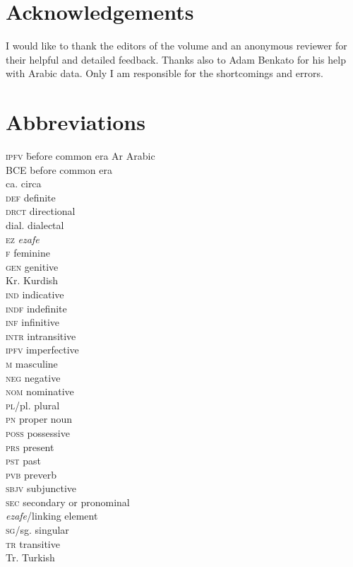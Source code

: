 \documentclass[output=paper]{langsci/langscibook}
\begin{document}
\section*{Acknowledgements}
I would like to thank the editors of the volume and an anonymous reviewer for their helpful and detailed feedback. Thanks also to Adam Benkato for his help with Arabic data. Only I am responsible for the shortcomings and errors. 

\section*{Abbreviations}
\begin{multicols}{2}
\begin{tabbing}
\textsc{ipfv} \hspace{1em} \= before common era\kill
Ar              \> Arabic\\
BCE             \> before common era\\
ca.             \> circa\\
\textsc{def}    \> definite \\
\textsc{drct}   \> directional\\
dial.           \> dialectal \\
\textsc{ez}     \> \textit{ezafe} \\
\textsc{f}      \> feminine \\
\textsc{gen}    \> genitive\\
Kr.             \> Kurdish\\
\textsc{ind}    \> indicative \\
\textsc{indf}   \> indefinite \\
\textsc{inf}    \> infinitive\\
\textsc{intr}   \> intransitive\\
\textsc{ipfv}   \> imperfective \\
\textsc{m}      \> masculine \\
\textsc{neg}    \> negative\\
\textsc{nom}    \> nominative\\
\textsc{pl/}pl. \> plural \\
\textsc{pn}     \> proper noun\\
\textsc{poss}   \> possessive \\
\textsc{prs}    \> present \\
\textsc{pst}    \> past \\
\textsc{pvb}    \> preverb\\
\textsc{sbjv}   \> subjunctive \\
\textsc{sec}    \> secondary or pronominal \\ \> \textit{ezafe}/linking element\\
\textsc{sg/}sg. \> singular\\
\textsc{tr}     \> transitive\\
Tr.             \> Turkish
\end{tabbing}
\end{multicols}
\end{document}
